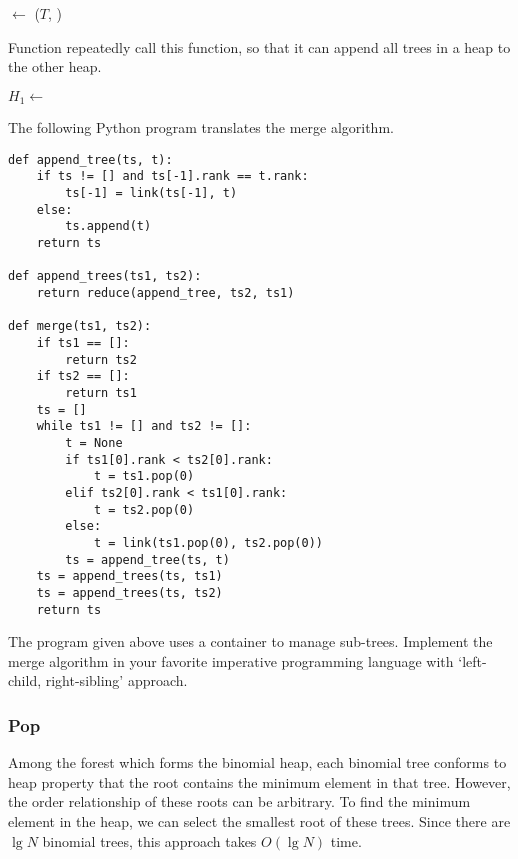 \documentclass{article}
\begin{document}
\begin{algorithmic}[1]
    \State {} $\gets$ ($T$, )
  \Else
    \State {}
  \EndIf
\EndFunction
\end{algorithmic}

Function  repeatedly call this function, so 
that it can append all trees in a heap to the other heap.

\begin{algorithmic}[1]
    \State $H_1 \gets $ 
  \EndFor
\EndFunction
\end{algorithmic}

The following Python program translates the merge algorithm.

\lstset{language=Python}
\begin{lstlisting}
def append_tree(ts, t):
    if ts != [] and ts[-1].rank == t.rank:
        ts[-1] = link(ts[-1], t)
    else:
        ts.append(t)
    return ts

def append_trees(ts1, ts2):
    return reduce(append_tree, ts2, ts1)

def merge(ts1, ts2):
    if ts1 == []:
        return ts2
    if ts2 == []:
        return ts1
    ts = []
    while ts1 != [] and ts2 != []:
        t = None
        if ts1[0].rank < ts2[0].rank:
            t = ts1.pop(0)
        elif ts2[0].rank < ts1[0].rank:
            t = ts2.pop(0)
        else:
            t = link(ts1.pop(0), ts2.pop(0))
        ts = append_tree(ts, t)
    ts = append_trees(ts, ts1)
    ts = append_trees(ts, ts2)
    return ts
\end{lstlisting}

\begin{Exercise}

The program given above uses a container to manage sub-trees.
Implement the merge algorithm in your favorite imperative programming
language with `left-child, right-sibling' approach.

\end{Exercise}

\subsubsection{Pop}
Among the forest which forms the binomial heap, each binomial tree 
conforms to heap property that the root contains the minimum element 
in that tree. However, the order relationship of these roots can be
arbitrary. To find the minimum element in the heap, we can select the 
smallest root of these trees. Since there are $\lg N$ binomial trees, 
this approach takes $O(\lg N)$ time.
\end{document}
